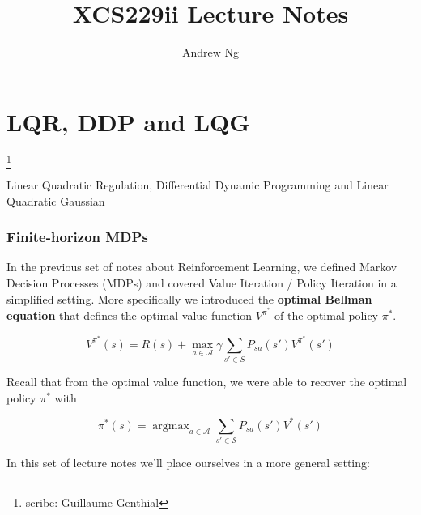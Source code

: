 \documentclass{article}
\newcommand\blfootnote[1]{%
	\begingroup
	\renewcommand\thefootnote{}\footnote{#1}%
	\addtocounter{footnote}{-1}%
	\endgroup
}
\begin{document}
\title{XCS229ii Lecture Notes}
\author{Andrew Ng}
\date{}
\maketitle




\setcounter{part}{13}
\part{LQR, DDP and LQG}\blfootnote{scribe: Guillaume Genthial}
Linear Quadratic Regulation, Differential Dynamic Programming and Linear Quadratic Gaussian 

\section{Finite-horizon MDPs}
\label{sec:1}
In the previous set of notes about Reinforcement Learning, we defined Markov Decision Processes (MDPs) and covered Value Iteration / Policy Iteration in a simplified setting. More specifically we introduced the \textbf{optimal Bellman equation} that defines the optimal value function $ V^{\pi^*} $ of the optimal policy $ \pi^* $.

\[ V^{\pi^*} (s) = R(s) + \max_{a \in \mathcal{A}} \gamma \sum_{s' \in S} P_{s a} (s') V^{\pi^*} (s') \]

Recall that from the optimal value function, we were able to recover the optimal policy $ \pi^* $ with

\[ \pi^* (s) = \operatorname{argmax}_{a \in \mathcal{A}} \sum_{s' \in \mathcal{S}} P_{sa}(s') V^{*} (s') \]

In this set of lecture notes we'll place ourselves in a more general setting:
\end{document}
